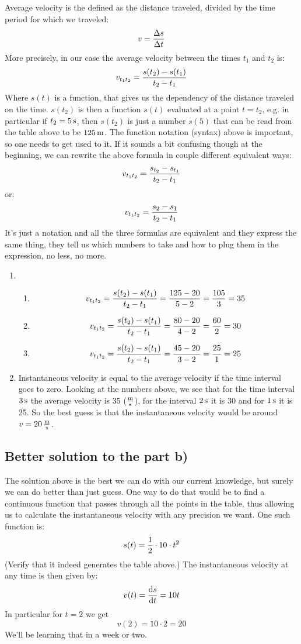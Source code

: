 \documentclass[10pt]{article}
\begin{document}
Average velocity is the defined as the distance traveled, divided by the time
period for which we traveled:
$$v={\Delta s\over\Delta t}$$
More precisely, in our case the average velocity between the times $t_1$ and
$t_2$ is:
$$v_{t_1t_2} = {s(t_2)-s(t_1)\over t_2-t_1}$$
Where $s(t)$ is a function, that gives us the dependency of the distance
traveled on the time. $s(t_2)$ is then a function $s(t)$ evaluated at a point
$t=t_2$, e.g. in particular if $t_2=5\rm\,s$, then $s(t_2)$ is just a number
$s(5)$ that can be read from the table above to be $125\rm\,m$. The function
notation (syntax) above is important, so one needs to get used to it. If it
sounds a bit confusing though at the beginning, we can rewrite the above formula in couple different
equivalent ways:
$$v_{t_1t_2} = {s_{t_2}-s_{t_1}\over t_2-t_1}$$
or:
$$v_{t_1t_2} = {s_2-s_1\over t_2-t_1}$$
It's just a notation and all the three formulas are equivalent and they express
the same thing, they tell us which numbers to take and how to plug them in the
expression, no less, no more.
\begin{enumerate}
\item
\begin{enumerate}
\item $$v_{t_1t_2} = {s(t_2)-s(t_1)\over t_2-t_1}={125-20\over5-2}=
{105\over3}=35$$
\item $$v_{t_1t_2} = {s(t_2)-s(t_1)\over t_2-t_1}={80-20\over4-2}=
{60\over2}=30$$
\item $$v_{t_1t_2} = {s(t_2)-s(t_1)\over t_2-t_1}={45-20\over3-2}=
{25\over1}=25$$
\end{enumerate}
\item Instantaneous velocity is equal to the average velocity if the time
interval goes to zero. Looking at the numbers above, we see that for the time
interval $3\rm\,s$ the average velocity is 35 ($\rm m\over s$), for the
interval $2\rm\,s$ it is 30 and for $1\rm\,s$ it is 25. So the best guess is
that the instantaneous velocity would be around $v=20\rm\,{m\over s}$.
\end{enumerate}

\subsection*{Better solution to the part b)}

The solution above is the best we can do with our current knowledge, but surely
we can do better than just guess. One way to do that would be to find a
continuous function that passes through all the points in the table, thus
allowing us to calculate the instantaneous velocity with any precision we want.
One such function is:
$$s(t) = {1\over 2}\cdot10\cdot t^2$$
(Verify that it indeed generates the table above.) The instantaneous velocity at
any time is then given by:
$$v(t) = {{\rm d} s\over{\rm d} t} = 10t$$
In particular for $t=2$ we get
$$v(2) = 10\cdot 2 = 20$$
We'll be learning that in a week or two.
\end{document}
